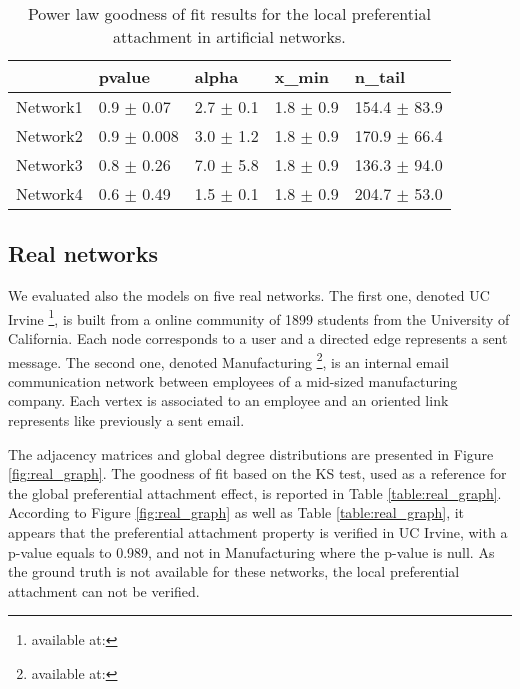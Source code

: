 \documentclass[a4paper, 12pt]{article}
\begin{document}
\begin{table}[h]
\caption{Power law goodness of fit results for the local preferential attachment in artificial networks.}
\centering
    \begin{tabular}{lllll}
    \hline
    & pvalue          & alpha           & x\_min        & n\_tail           \\
    \hline
    Network1 & 0.9 $\pm$ 0.07  & 2.7 $\pm$ 0.1 & 1.8 $\pm$ 0.9 & 154.4 $\pm$ 83.9 \\
    Network2 & 0.9 $\pm$ 0.008 & 3.0 $\pm$ 1.2  & 1.8 $\pm$ 0.9 & 170.9 $\pm$ 66.4  \\
    Network3 & 0.8 $\pm$ 0.26 & 7.0 $\pm$ 5.8 & 1.8 $\pm$ 0.9 & 136.3 $\pm$ 94.0 \\
    Network4 & 0.6 $\pm$ 0.49    & 1.5 $\pm$ 0.1 & 1.8 $\pm$ 0.9 & 204.7 $\pm$ 53.0 \\
    \hline
    \end{tabular}




\label{table:synt_graph_local}
\end{table}

\subsection{Real networks}

We evaluated also the models on five real networks.
The first one, denoted UC Irvine \footnote{available at:}, is built from a online community of 1899 students from the University of California. Each node corresponds to a user and a   directed edge represents a sent message.
The second one, denoted Manufacturing \footnote{available at:}, is an internal email communication network between employees of a mid-sized manufacturing company. Each vertex is associated  to an employee and an oriented link represents like previously a sent email.

The adjacency matrices and global degree distributions are presented in Figure \ref{fig:real_graph}. The goodness of fit based on the KS test, used as a reference for the global preferential attachment effect, is reported in Table \ref{table:real_graph}. According to Figure \ref{fig:real_graph} as well as Table \ref{table:real_graph}, it appears that the preferential attachment property is verified in UC Irvine, with a p-value equals to 0.989, and not in Manufacturing where the p-value is null. As the ground truth is not available for these networks, the local preferential attachment can not be verified.
\end{document}
